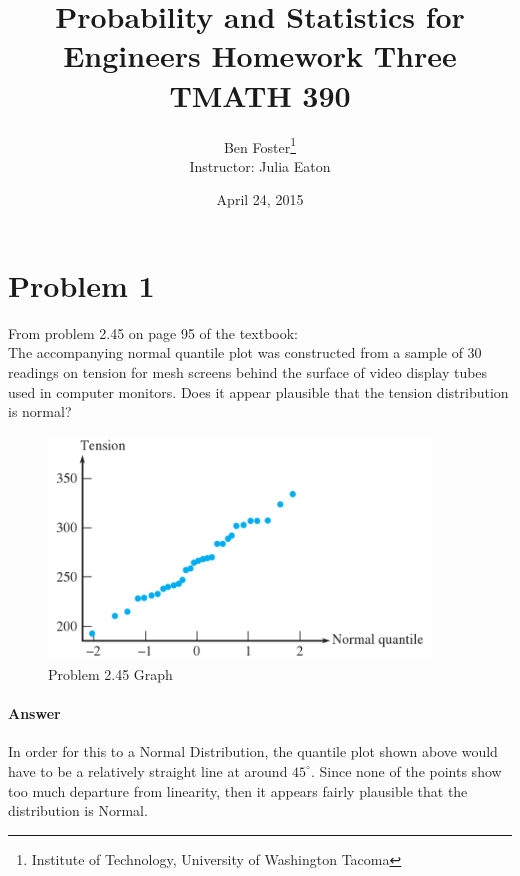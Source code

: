 \documentclass{article}
\newcommand{\p}[1]{\paragraph{#1}} %
\begin{document}
{ %
	\title{Probability and Statistics for Engineers Homework Three \\ TMATH 390}
	\author{Ben Foster\thanks{
		Institute of Technology, University of Washington Tacoma} \\
		Instructor: Julia Eaton}
	\date{April 24, 2015}
	\maketitle
	\thispagestyle{empty} %
	\clearpage
	
	\tableofcontents
	\clearpage
	\setcounter{page}{1}
}


\section*{Problem 1} %

	From problem 2.45 on page 95 of the textbook: \\

	The accompanying normal quantile plot was constructed from a sample of 30 readings on 
	tension for mesh screens behind the surface of video display tubes used in computer monitors. 
	Does it appear plausible that the tension distribution is normal?
	
	\begin{figure}[!htb]
		\centering
		\includegraphics[width=4in]{img/Prob2_45Graph.jpg} 
		\caption{Problem 2.45 Graph}
		\label{fig:example}
	\end{figure}
	
	\p{Answer} In order for this to a Normal Distribution, the quantile plot shown above would have 
	to be a relatively straight line at around $45^\circ$. Since none of the points show too much 
	departure from linearity, then it appears fairly plausible that the distribution is Normal.
	
\end{document}
